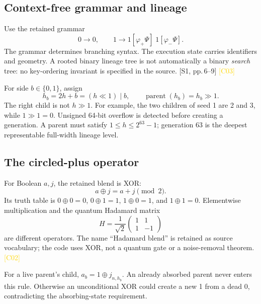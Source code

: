 \documentclass[11pt,a4paper]{article}
\newcommand{\src}[2]{\textcolor{muted}{[#1, #2]}}
\newcommand{\corr}[1]{\textcolor{gold}{\textsf{[#1]}}}
\newcommand{\ph}{\varphi}
\begin{document}
\subsection{Context-free grammar and lineage}
Use the retained grammar
\begin{equation}
 0\longrightarrow0,\qquad
 1\longrightarrow1[\ph_+\Psi]\;1[\ph_-\Psi].
\end{equation}
The grammar determines branching syntax. The execution state carries identifiers and geometry. A rooted binary lineage tree is not automatically a binary \emph{search} tree: no key-ordering invariant is specified in the source. \src{S1}{pp.\,6--9} \corr{C03}

For side $b\in\{0,1\}$, assign
\begin{equation}
 h_b=2h+b=(h\ll1)\mathbin{|}b,\qquad \operatorname{parent}(h_b)=h_b\gg1.
\end{equation}
The right child is not $h\gg1$. For example, the two children of seed 1 are 2 and 3, while $1\gg1=0$. Unsigned 64-bit overflow is detected before creating a generation. A parent must satisfy $1\le h\le2^{63}-1$; generation 63 is the deepest representable full-width lineage level.

\subsection{The circled-plus operator}
For Boolean $a,j$, the retained blend is XOR:
\begin{equation}
 a\oplus j=a+j\pmod2.
\end{equation}
Its truth table is $0\oplus0=0$, $0\oplus1=1$, $1\oplus0=1$, and $1\oplus1=0$. Elementwise multiplication and the quantum Hadamard matrix
\[
 H=\frac{1}{\sqrt2}\begin{pmatrix}1&1\\1&-1\end{pmatrix}
\]
are different operators. The name ``Hadamard blend'' is retained as source vocabulary; the code uses XOR, not a quantum gate or a noise-removal theorem. \corr{C02}

For a live parent's child, $a_b=1\oplus j_{n,h_b}$. An already absorbed parent never enters this rule. Otherwise an unconditional XOR could create a new 1 from a dead 0, contradicting the absorbing-state requirement.
\end{document}
